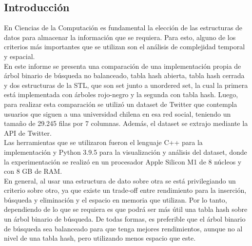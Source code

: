 \begin{multicols}{2}
\section{Introducción}

En Ciencias de la Computación es fundamental la elección de las estructuras de datos para almacenar la información que se requiera. Para esto, alguno de los criterios más importantes que se utilizan son el análisis de complejidad temporal y espacial.\\
\indent En este informe se presenta una comparación de una implementación propia de árbol binario de búsqueda no balanceado, tabla hash abierta, tabla hash cerrada y dos estructuras de la STL, que son set junto a unordered set, la cual la primera está implementada con árboles rojo-negro y la segunda con tabla hash. Luego, para realizar esta comparación se utilizó un dataset de Twitter que contempla usuarios que siguen a una universidad chilena en esa red social, teniendo un tamaño de 29.245 filas por 7 columnas. Además, el dataset se extrajo mediante la API de Twitter. \\
\indent Las herramientas que se utilizaron fueron el lenguaje C++ para la implementación y Python 3.9.5 para la visualización y análisis del dataset, donde la experimentación se realizó en un procesador Apple Silicon M1 de 8 núcleos y con 8 GB de RAM.\\
En general, al usar una estructura de dato sobre otra se está privilegiando un criterio sobre otro, ya que existe un trade-off entre rendimiento para la inserción, búsqueda y eliminación y el espacio en memoria que utilizan. Por lo tanto, dependiendo de lo que se requiera es que podrá ser más útil una tabla hash sobre un árbol binario de búsqueda. De todas formas, es preferible que el árbol binario de búsqueda sea balanceado para que tenga mejores rendimientos, aunque no al nivel de una tabla hash, pero utilizando menos espacio que este. \\


\end{multicols}
